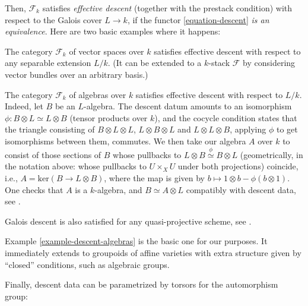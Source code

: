 Then, $\mathcal F_k$ satisfies \emph{effective descent} (together with the prestack condition) with respect to the Galois cover $L\to k$, if the functor \eqref{equation-descent} \emph{is an equivalence}. Here are two basic examples where it happens:

\begin{example}
 \label{example-descent-vectorspaces}
The category $\mathcal F_k$ of vector spaces over $k$ satisfies effective descent with respect to any separable extension $L/k$. (It can be extended to a $k$-stack $\mathcal F$ by considering vector bundles over an arbitrary basis.)
\end{example}

\begin{example}
\label{example-descent-algebras}
The category $\mathcal F_k$ of algebras over $k$ satisfies effective descent with respect to $L/k$. Indeed, let $B$ be an $L$-algebra. The descent datum amounts to an isomorphism $\phi: B\otimes L \simeq L \otimes B$ (tensor products over $k$), and the cocycle condition states that the triangle consisting of $B\otimes L \otimes L$, $L\otimes B\otimes L$ and $L\otimes L\otimes B$, applying $\phi$ to get isomorphisms between them, commutes. We then take our algebra $A$ over $k$ to consist of those sections of $B$ whose pullbacks to $L\otimes B \overset{\phi}\simeq B\otimes L$ (geometrically, in the notation above: whose pullbacks to $U\times_X U$ under both projections) coincide, i.e., $A=\text{ker}(B\to L\otimes B)$, where the map is given by $b\mapsto 1\otimes b - \phi(b\otimes 1)$. One checks that $A$ is a $k$-algebra, and $B \simeq A \otimes L$ compatibly with descent data, see \cite[Tag 0244]{stacks-project}.
\end{example}

\begin{example}
 \label{example-descent-quasiprojective}
Galois descent is also satisfied for any quasi-projective scheme, see \cite[\S 6.2, Example B]{Neron}.
\end{example}

Example \ref{example-descent-algebras} is the basic one for our purposes. It immediately extends to groupoids of affine varieties with extra structure given by ``closed'' conditions, such as algebraic groups. 


Finally, descent data can be parametrized by torsors for the automorphism group:

